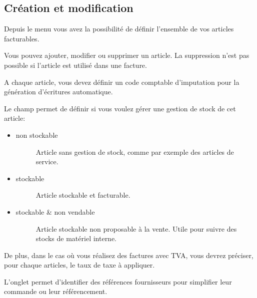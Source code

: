 \documentclass[a4paper,10pt,oneside,french]{sphinxmanual}
\begin{document}
\subsection{Création et modification}
\label{\detokenize{invoice/articles:creation-et-modification}}
Depuis le menu  vous avez la possibilité de définir l’ensemble de vos articles facturables.

\noindent{}

Vous pouvez ajouter, modifier ou supprimer un article. La suppression n’est pas possible si l’article est utilisé dans une facture.

A chaque article, vous devez définir un code comptable d’imputation pour la génération d’écritures automatique.

Le champ  permet de définir si vous voulez gérer une gestion de stock de cet article:
\begin{itemize}
\item {} \begin{description}
\item[{non stockable}] \leavevmode
Article sans gestion de stock, comme par exemple des articles de service.

\end{description}

\item {} \begin{description}
\item[{stockable}] \leavevmode
Article stockable et facturable.

\end{description}

\item {} \begin{description}
\item[{stockable \& non vendable}] \leavevmode
Article stockable non proposable à la vente.
Utile pour suivre des stocks de matériel interne.

\end{description}

\end{itemize}

De plus, dans le cas où vous réalisez des factures avec TVA, vous devrez préciser, pour chaque articles, le taux de taxe à appliquer.

L’onglet  permet d’identifier des références fournisseurs pour simplifier leur commande ou leur référencement.
\end{document}

